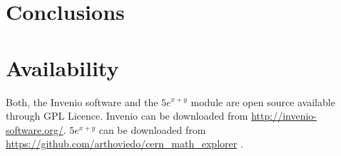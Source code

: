 \documentclass{sig-alternate}
\begin{document}
\section{Conclusions}


\section{Availability}
Both, the Invenio software and the $5e^{x+y}$ module are open source available through GPL Licence. Invenio can be downloaded from \url{http://invenio-software.org/}. $5e^{x+y}$ can be downloaded from \\ \url{https://github.com/arthoviedo/cern_math_explorer} .




%

%
%
\end{document}
